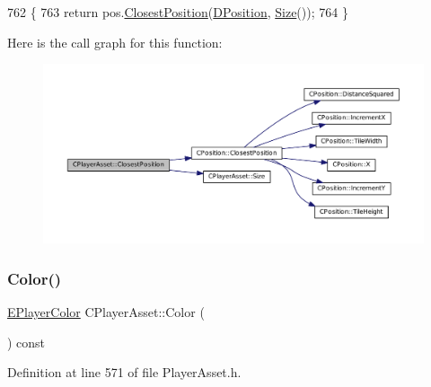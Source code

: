 \begin{DoxyCode}
762                                                                  \{
763     \textcolor{keywordflow}{return} pos.\hyperlink{classCPosition_a91fd43eeb2c894bcb7577ae87247b726}{ClosestPosition}(\hyperlink{classCPlayerAsset_aa9f53c009b181c7c5647c6b03776a04c}{DPosition}, \hyperlink{classCPlayerAsset_a85a9e2ce62f557e93219676117159fec}{Size}());
764 \}
\end{DoxyCode}
Here is the call graph for this function\+:\nopagebreak
\begin{figure}[H]
\begin{center}
\leavevmode
\includegraphics[width=350pt]{classCPlayerAsset_a67e700ce77122894c02da584dd652767_cgraph}
\end{center}
\end{figure}
\hypertarget{classCPlayerAsset_a969e6e60c6343186d2b9a6cddd6654f8}{}\label{classCPlayerAsset_a969e6e60c6343186d2b9a6cddd6654f8} 
\subsubsection{\texorpdfstring{Color()}{Color()}}
{\footnotesize\ttfamily \hyperlink{GameDataTypes_8h_aafb0ca75933357ff28a6d7efbdd7602f}{E\+Player\+Color} C\+Player\+Asset\+::\+Color (\begin{DoxyParamCaption}{ }\end{DoxyParamCaption}) const\hspace{0.3cm}{\ttfamily [inline]}}



Definition at line 571 of file Player\+Asset.\+h.


